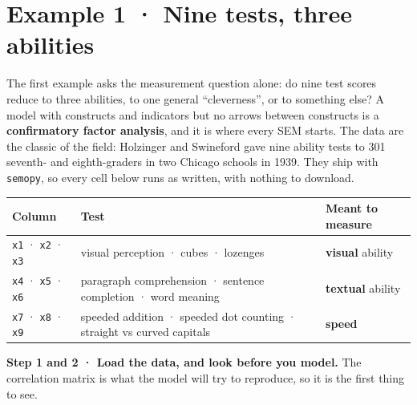 \documentclass[
  letterpaper,
  10pt,
  twoside,
  openright,
  numbers=noenddot,
  chapterprefix=true]{scrbook}
\begin{document}
\section{Example 1 · Nine tests, three
abilities}\label{example-1-nine-tests-three-abilities}

The first example asks the measurement question alone: do nine test
scores reduce to three abilities, to one general ``cleverness'', or to
something else? A model with constructs and indicators but no arrows
between constructs is a \textbf{confirmatory factor analysis}, and it is
where every SEM starts. The data are the classic of the field: Holzinger
and Swineford gave nine ability tests to 301 seventh- and eighth-graders
in two Chicago schools in 1939. They ship with \texttt{semopy}, so every
cell below runs as written, with nothing to download.

\begin{longtable}[]{@{}
  >{\raggedright\arraybackslash}p{}
  >{\raggedright\arraybackslash}p{}
  >{\raggedright\arraybackslash}p{}@{}}
\toprule\noalign{}
\begin{minipage}[b]{\linewidth}\raggedright
Column
\end{minipage} & \begin{minipage}[b]{\linewidth}\raggedright
Test
\end{minipage} & \begin{minipage}[b]{\linewidth}\raggedright
Meant to measure
\end{minipage} \\
\midrule\noalign{}
\endhead
\bottomrule\noalign{}
\endlastfoot
\texttt{x1} · \texttt{x2} · \texttt{x3} & visual perception · cubes ·
lozenges & \textbf{visual} ability \\
\texttt{x4} · \texttt{x5} · \texttt{x6} & paragraph comprehension ·
sentence completion · word meaning & \textbf{textual} ability \\
\texttt{x7} · \texttt{x8} · \texttt{x9} & speeded addition · speeded dot
counting · straight vs curved capitals & \textbf{speed} \\
\end{longtable}

\textbf{Step 1 and 2 · Load the data, and look before you model.} The
correlation matrix is what the model will try to reproduce, so it is the
first thing to see.
\end{document}
